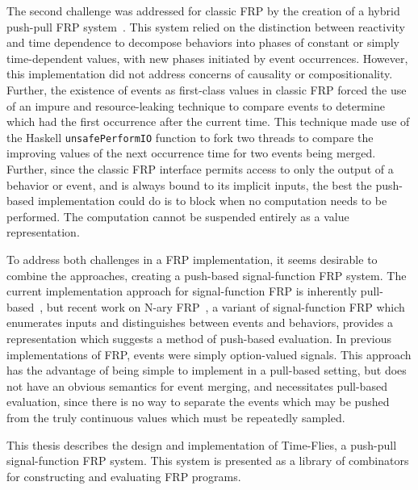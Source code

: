 The second challenge was addressed for classic FRP by the creation of a hybrid push-pull FRP system~\cite{Elliott2009}. This system relied
on the distinction between reactivity and time dependence to decompose behaviors into phases of constant or simply time-dependent values,
with new phases initiated by event occurrences. However, this implementation did not address concerns of causality or compositionality.
Further, the existence of events as first-class values in classic FRP forced the use of an impure and resource-leaking technique to compare
events to determine which had the first occurrence after the current time. This technique made use of the Haskell {\tt unsafePerformIO} function
to fork two threads to compare the improving values of the next occurrence time for two events being merged. Further, since the classic FRP
interface permits access to only the output of a behavior or event, and is always bound to its implicit inputs, the best the push-based implementation
could do is to block when no computation needs to be performed. The computation cannot be suspended entirely as a value representation.

To address both challenges in a FRP implementation, it seems desirable to combine the approaches, creating a push-based
signal-function FRP system. The current implementation approach for signal-function FRP is inherently pull-based~\cite{Nilsson2002}, but
recent work on N-ary FRP~\cite{Sculthorpe2011}, a variant of signal-function FRP which enumerates inputs and distinguishes between events and behaviors, provides a representation which suggests
a method of push-based evaluation. In previous implementations of FRP, events were simply
option-valued signals. This approach has the advantage of being simple to implement in a pull-based setting, but does not have an obvious
semantics for event merging, and necessitates pull-based evaluation, since there is no way to separate the events which may be pushed from
the truly continuous values which must be repeatedly sampled.

This thesis describes the design and implementation of Time-Flies, a push-pull signal-function FRP system. This system is presented as a library
of combinators for constructing and evaluating FRP programs.
